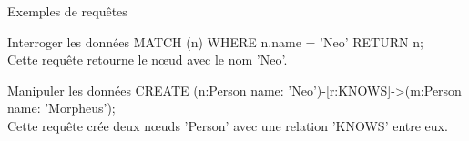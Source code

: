 \begin{frame}{Exemples de requêtes}
  \begin{block}{Interroger les données}
    MATCH (n) WHERE n.name = 'Neo' RETURN n;\\
    Cette requête retourne le nœud avec le nom 'Neo'.
  \end{block}
    \begin{block}{Manipuler les données}
    CREATE (n:Person {name: 'Neo'})-[r:KNOWS]->(m:Person {name: 'Morpheus'});\\
    Cette requête crée deux nœuds 'Person' avec une relation 'KNOWS' entre eux.
  \end{block}
\end{frame}
